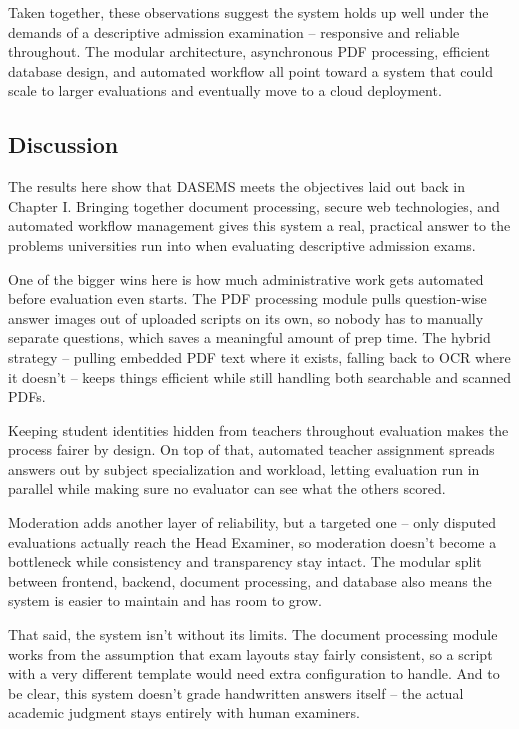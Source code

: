 Taken together, these observations suggest the system holds up well under the demands of a descriptive admission examination -- responsive and reliable throughout. The modular architecture, asynchronous PDF processing, efficient database design, and automated workflow all point toward a system that could scale to larger evaluations and eventually move to a cloud deployment.

\subsection{Discussion}

The results here show that DASEMS meets the objectives laid out back in Chapter I. Bringing together document processing, secure web technologies, and automated workflow management gives this system a real, practical answer to the problems universities run into when evaluating descriptive admission exams.

One of the bigger wins here is how much administrative work gets automated before evaluation even starts. The PDF processing module pulls question-wise answer images out of uploaded scripts on its own, so nobody has to manually separate questions, which saves a meaningful amount of prep time. The hybrid strategy -- pulling embedded PDF text where it exists, falling back to OCR where it doesn't -- keeps things efficient while still handling both searchable and scanned PDFs.

Keeping student identities hidden from teachers throughout evaluation makes the process fairer by design. On top of that, automated teacher assignment spreads answers out by subject specialization and workload, letting evaluation run in parallel while making sure no evaluator can see what the others scored.

Moderation adds another layer of reliability, but a targeted one -- only disputed evaluations actually reach the Head Examiner, so moderation doesn't become a bottleneck while consistency and transparency stay intact. The modular split between frontend, backend, document processing, and database also means the system is easier to maintain and has room to grow.

That said, the system isn't without its limits. The document processing module works from the assumption that exam layouts stay fairly consistent, so a script with a very different template would need extra configuration to handle. And to be clear, this system doesn't grade handwritten answers itself -- the actual academic judgment stays entirely with human examiners.

